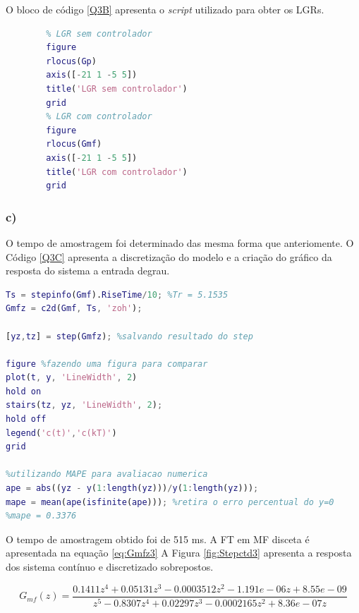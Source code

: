     O bloco de código \ref{Q3B} apresenta o \textit{script} utilizado para obter os LGRs.

\begin{lstlisting}[language=Matlab,label=Q3B,caption= Análise da estabilidade]
        % b)
        % LGR sem controlador
        figure
        rlocus(Gp)
        axis([-21 1 -5 5])
        title('LGR sem controlador')
        grid
        % LGR com controlador
        figure
        rlocus(Gmf)
        axis([-21 1 -5 5])
        title('LGR com controlador')
        grid
 \end{lstlisting}


\newpage
\subsubsection*{c)}

    O tempo de amostragem foi determinado das mesma forma que anteriomente. O Código \ref{Q3C} apresenta
    a discretização do modelo e a criação do gráfico da resposta do sistema a entrada degrau.

    \begin{lstlisting}[language=Matlab,label=Q3C,caption=Análise da estabilidade]
Ts = stepinfo(Gmf).RiseTime/10; %Tr = 5.1535
Gmfz = c2d(Gmf, Ts, 'zoh');

[yz,tz] = step(Gmfz); %salvando resultado do step

figure %fazendo uma figura para comparar
plot(t, y, 'LineWidth', 2)
hold on
stairs(tz, yz, 'LineWidth', 2);
hold off
legend('c(t)','c(kT)')
grid

%utilizando MAPE para avaliacao numerica
ape = abs((yz - y(1:length(yz)))/y(1:length(yz))); 
mape = mean(ape(isfinite(ape))); %retira o erro percentual do y=0
%mape = 0.3376
    \end{lstlisting}

    O tempo de amostragem obtido foi de 515 ms. A FT em MF disceta é apresentada na equação \ref{eq:Gmfz3}
    A Figura \ref{fig:Stepctd3} apresenta a resposta dos sistema contínuo e discretizado sobrepostos. 

    \begin{equation}
        G_{mf}(z) = \frac{0.1411 z^4 + 0.05131 z^3 - 0.0003512 z^2 - 1.191e-06 z + 8.55e-09}{z^5 - 0.8307 z^4 + 0.02297 z^3 - 0.0002165 z^2 + 8.36e-07 z }
        \label{eq:Gmfz3}
    \end{equation}


